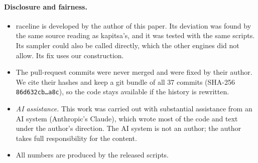 \documentclass[10pt]{article}
\theoremstyle{remark}
\begin{document}
\paragraph{Disclosure and fairness.}
\begin{itemize}
\item raceline is developed by the author of this paper. Its deviation was found by the same source reading as kapitsa's, and it was tested with the same scripts. Its sampler could also be called directly, which the other engines did not allow. Its fix uses our construction.
\item The pull-request commits were never merged and were fixed by their author. We cite their hashes and keep a git bundle of all 37 commits (SHA-256 \texttt{86d632cb\ldots{}a8c}), so the code stays available if the history is rewritten.
\item \emph{AI assistance.} This work was carried out with substantial assistance from an AI system (Anthropic's Claude), which wrote most of the code and text under the author's direction. The AI system is not an author; the author takes full responsibility for the content.
\item All numbers are produced by the released scripts.
\end{itemize}
\end{document}
